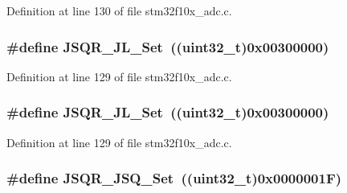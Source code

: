 Definition at line 130 of file stm32f10x\+\_\+adc.\+c.

\subsubsection[{\texorpdfstring{J\+S\+Q\+R\+\_\+\+J\+L\+\_\+\+Set}{JSQR_JL_Set}}]{\setlength{\rightskip}{0pt plus 5cm}\#define J\+S\+Q\+R\+\_\+\+J\+L\+\_\+\+Set~(({\bf uint32\+\_\+t})0x00300000)}\hypertarget{group___a_d_c___private___defines_ga46af9e738702305be0127f6c15c4f7b0}{}\label{group___a_d_c___private___defines_ga46af9e738702305be0127f6c15c4f7b0}


Definition at line 129 of file stm32f10x\+\_\+adc.\+c.

\subsubsection[{\texorpdfstring{J\+S\+Q\+R\+\_\+\+J\+L\+\_\+\+Set}{JSQR_JL_Set}}]{\setlength{\rightskip}{0pt plus 5cm}\#define J\+S\+Q\+R\+\_\+\+J\+L\+\_\+\+Set~(({\bf uint32\+\_\+t})0x00300000)}\hypertarget{group___a_d_c___private___defines_ga46af9e738702305be0127f6c15c4f7b0}{}\label{group___a_d_c___private___defines_ga46af9e738702305be0127f6c15c4f7b0}


Definition at line 129 of file stm32f10x\+\_\+adc.\+c.

\subsubsection[{\texorpdfstring{J\+S\+Q\+R\+\_\+\+J\+S\+Q\+\_\+\+Set}{JSQR_JSQ_Set}}]{\setlength{\rightskip}{0pt plus 5cm}\#define J\+S\+Q\+R\+\_\+\+J\+S\+Q\+\_\+\+Set~(({\bf uint32\+\_\+t})0x0000001\+F)}\hypertarget{group___a_d_c___private___defines_ga5d460390dbe3b400b5e0fdf1e94929f0}{}\label{group___a_d_c___private___defines_ga5d460390dbe3b400b5e0fdf1e94929f0}


